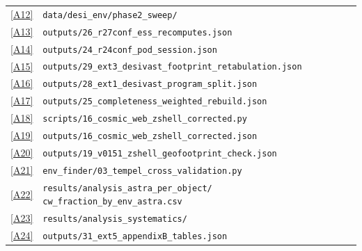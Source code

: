 \documentclass[aps,prd,twocolumn,superscriptaddress,showpacs,preprintnumbers,nofootinbib,longbibliography,floatfix]{revtex4-2}
\newcommand{\repoBase}{https://github.com/Hubify-Projects/bigbounce/blob/main}
\begin{document}
\begin{table}[h!]
{\begin{ruledtabular}
\begin{tabular}{lp{}}
\href{\repoBase/pipelines/p5\_desi\_chirality/data/desi\_env/phase2\_sweep}{[A12]} & \texttt{data/desi\_env/phase2\_sweep/} \\
\href{\repoBase/pipelines/p5\_desi\_chirality/outputs/26\_r27conf\_ess\_recomputes.json}{[A13]} & \texttt{outputs/26\_r27conf\_ess\_recomputes.json} \\
\href{\repoBase/pipelines/p5\_desi\_chirality/outputs/24\_r24conf\_pod\_session.json}{[A14]} & \texttt{outputs/24\_r24conf\_pod\_session.json} \\
\href{\repoBase/pipelines/p5\_desi\_chirality/outputs/29\_ext3\_desivast\_footprint\_retabulation.json}{[A15]} & \texttt{outputs/29\_ext3\_desivast\_footprint\_retabulation.json} \\
\href{\repoBase/pipelines/p5\_desi\_chirality/outputs/28\_ext1\_desivast\_program\_split.json}{[A16]} & \texttt{outputs/28\_ext1\_desivast\_program\_split.json} \\
\href{\repoBase/pipelines/p5\_desi\_chirality/outputs/25\_completeness\_weighted\_rebuild.json}{[A17]} & \texttt{outputs/25\_completeness\_weighted\_rebuild.json} \\
\href{\repoBase/pipelines/p5\_desi\_chirality/scripts/16\_cosmic\_web\_zshell\_corrected.py}{[A18]} & \texttt{scripts/16\_cosmic\_web\_zshell\_corrected.py} \\
\href{\repoBase/pipelines/p5\_desi\_chirality/outputs/16\_cosmic\_web\_zshell\_corrected.json}{[A19]} & \texttt{outputs/16\_cosmic\_web\_zshell\_corrected.json} \\
\href{\repoBase/pipelines/p5\_desi\_chirality/outputs/19\_v0151\_zshell\_geofootprint\_check.json}{[A20]} & \texttt{outputs/19\_v0151\_zshell\_geofootprint\_check.json} \\
\href{\repoBase/pipelines/p5\_desi\_chirality/env\_finder/03\_tempel\_cross\_validation.py}{[A21]} & \texttt{env\_finder/03\_tempel\_cross\_validation.py} \\
\href{\repoBase/pipelines/p5\_desi\_chirality/results/analysis\_astra\_per\_object/cw\_fraction\_by\_env\_astra.csv}{[A22]} & \texttt{results/analysis\_astra\_per\_object/} \texttt{cw\_fraction\_by\_env\_astra.csv} \\
\href{\repoBase/pipelines/p5\_desi\_chirality/results/analysis\_systematics/}{[A23]} & \texttt{results/analysis\_systematics/} \\
\href{\repoBase/pipelines/p5\_desi\_chirality/outputs/31\_ext5\_appendixB\_tables.json}{[A24]} & \texttt{outputs/31\_ext5\_appendixB\_tables.json} \\

\end{tabular}
\end{ruledtabular}}
\end{table}
\end{document}
